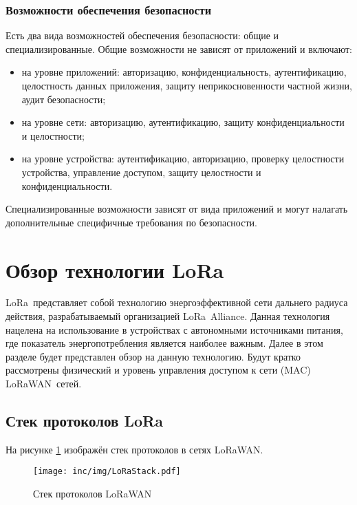 \subsubsection{Возможности обеспечения безопасности}

Есть два вида возможностей обеспечения безопасности: общие и специализированные.
Общие возможности не зависят от приложений и включают:
\begin{itemize}
	\item на уровне приложений: авторизацию, конфиденциальность, 
аутентификацию, целостность данных приложения, защиту неприкосновенности частной 
жизни, аудит безопасности;
	\item на уровне сети: авторизацию, аутентификацию, защиту 
конфиденциальности и целостности;
	\item на уровне устройства: аутентификацию, авторизацию, проверку 
целостности устройства, управление доступом, защиту целостности и 
конфиденциальности.
\end{itemize}

Специализированные возможности зависят от вида приложений и могут налагать 
дополнительные специфичные требования по безопасности.

\newpage
\section{Обзор технологии LoRa\texttrademark} 

LoRa\texttrademark~представляет собой технологию энергоэффективной сети 
дальнего радиуса действия, разрабатываемый организацией 
LoRa\texttrademark~Alliance.
Данная технология нацелена на использование в устройствах с автономными 
источниками питания, где показатель энергопотребления является наиболее важным.
Далее в этом разделе будет представлен обзор на данную технологию.
Будут кратко рассмотрены физический и уровень управления доступом к сети (MAC) 
LoRaWAN\texttrademark~сетей.

\subsection{Стек протоколов LoRa\texttrademark}

На рисунке \ref{fig:lorastack} изображён стек протоколов в сетях 
LoRaWAN\texttrademark. 

\begin{figure}[!h]
  \centering
  \texttt{[image: inc/img/LoRaStack.pdf]}
	\caption{Стек протоколов LoRaWAN\texttrademark}
  \label{fig:lorastack}
\end{figure}

